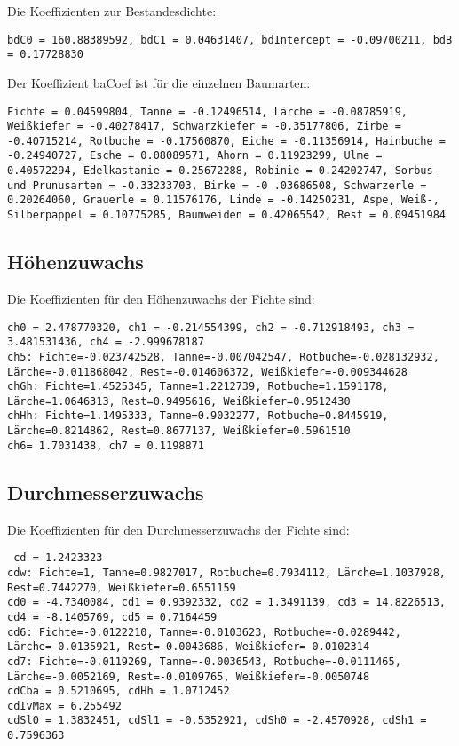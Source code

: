 \documentclass[twocolumn]{scrartcl}
\begin{document}
Die Koeffizienten zur Bestandesdichte:

\texttt{bdC0 = 160.88389592, bdC1 = 0.04631407, bdIntercept = -0.09700211, bdB = 0.17728830}

Der Koeffizient baCoef ist für die einzelnen Baumarten:

\texttt{Fichte = 0.04599804, Tanne = -0.12496514, Lärche = -0.08785919, Weißkiefer = -0.40278417, Schwarzkiefer = -0.35177806, Zirbe = -0.40715214, Rotbuche = -0.17560870, Eiche = -0.11356914, Hainbuche = -0.24940727, Esche = 0.08089571, Ahorn = 0.11923299, Ulme = 0.40572294, Edelkastanie = 0.25672288, Robinie = 0.24202747, Sorbus- und Prunusarten = -0.33233703, Birke = -0 .03686508, Schwarzerle = 0.20264060, Grauerle = 0.11576176, Linde = -0.14250231, Aspe, Weiß-, Silberpappel = 0.10775285, Baumweiden = 0.42065542, Rest = 0.09451984}

\subsection{Höhenzuwachs}

Die Koeffizienten für den Höhenzuwachs der Fichte sind:

\texttt{ch0 = 2.478770320, ch1 = -0.214554399, ch2 = -0.712918493, ch3 = 3.481531436, ch4 = -2.999678187\\
ch5: Fichte=-0.023742528, Tanne=-0.007042547, Rotbuche=-0.028132932, Lärche=-0.011868042, Rest=-0.014606372, Weißkiefer=-0.009344628\\
chGh: Fichte=1.4525345, Tanne=1.2212739, Rotbuche=1.1591178, Lärche=1.0646313, Rest=0.9495616, Weißkiefer=0.9512430\\
chHh: Fichte=1.1495333, Tanne=0.9032277, Rotbuche=0.8445919, Lärche=0.8214862, Rest=0.8677137, Weißkiefer=0.5961510\\
ch6= 1.7031438, ch7 = 0.1198871}


\subsection{Durchmesserzuwachs}

Die Koeffizienten für den Durchmesserzuwachs der Fichte sind:

\texttt{
  cd = 1.2423323\\
  cdw: Fichte=1, Tanne=0.9827017, Rotbuche=0.7934112, Lärche=1.1037928, Rest=0.7442270, Weißkiefer=0.6551159\\
  cd0 = -4.7340084, cd1 = 0.9392332, cd2 = 1.3491139, cd3 = 14.8226513, cd4 = -8.1405769, cd5 = 0.7164459\\
  cd6: Fichte=-0.0122210, Tanne=-0.0103623, Rotbuche=-0.0289442, Lärche=-0.0135921, Rest=-0.0043686, Weißkiefer=-0.0102314\\
  cd7: Fichte=-0.0119269, Tanne=-0.0036543, Rotbuche=-0.0111465, Lärche=-0.0052169, Rest=-0.0109765, Weißkiefer=-0.0050748\\
  cdCba = 0.5210695, cdHh = 1.0712452\\
  cdIvMax = 6.255492\\
  cdSl0 = 1.3832451, cdSl1 = -0.5352921, cdSh0 = -2.4570928, cdSh1 = 0.7596363\\
}
\end{document}
